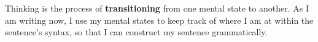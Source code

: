 \documentclass[orivec]{llncs}
\newcommand{\emp}[1]{\textbf{#1}}
\begin{document}
Thinking is the process of \emp{transitioning} from one mental state to another.  As I am writing now, I use my mental states to keep track of where I am at within the sentence's syntax, so that I can construct my sentence grammatically.


\end{document}
